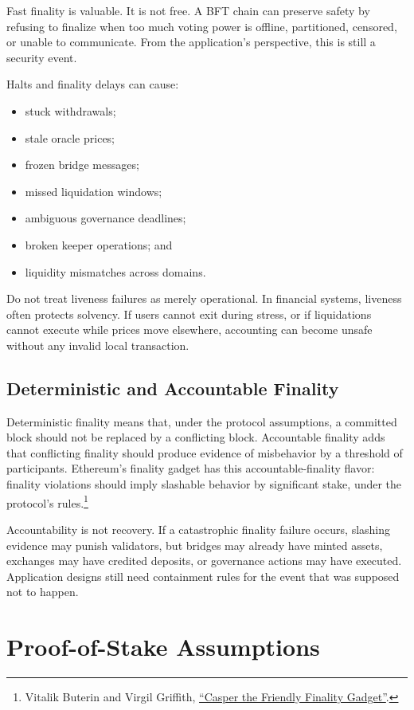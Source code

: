Fast finality is valuable. It is not free. A BFT chain can preserve safety by refusing to finalize when too much voting power is offline, partitioned, censored, or unable to communicate. From the application's perspective, this is still a security event.

Halts and finality delays can cause:

\begin{itemize}
\item stuck withdrawals;
\item stale oracle prices;
\item frozen bridge messages;
\item missed liquidation windows;
\item ambiguous governance deadlines;
\item broken keeper operations; and
\item liquidity mismatches across domains.
\end{itemize}

Do not treat liveness failures as merely operational. In financial systems, liveness often protects solvency. If users cannot exit during stress, or if liquidations cannot execute while prices move elsewhere, accounting can become unsafe without any invalid local transaction.

\subsection{Deterministic and Accountable Finality}

Deterministic finality means that, under the protocol assumptions, a committed block should not be replaced by a conflicting block. Accountable finality adds that conflicting finality should produce evidence of misbehavior by a threshold of participants. Ethereum's finality gadget has this accountable-finality flavor: finality violations should imply slashable behavior by significant stake, under the protocol's rules.\footnote{Vitalik Buterin and Virgil Griffith, \href{https://arxiv.org/abs/1710.09437}{``Casper the Friendly Finality Gadget''}.}

Accountability is not recovery. If a catastrophic finality failure occurs, slashing evidence may punish validators, but bridges may already have minted assets, exchanges may have credited deposits, or governance actions may have executed. Application designs still need containment rules for the event that was supposed not to happen.

\section{Proof-of-Stake Assumptions}

